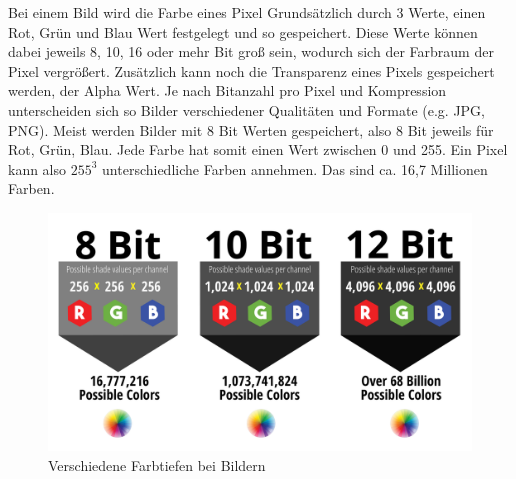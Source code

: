 Bei einem Bild wird die Farbe eines Pixel Grundsätzlich durch 3 Werte, einen Rot,
Grün und Blau Wert festgelegt und so gespeichert. Diese Werte können dabei jeweils
8, 10, 16 oder mehr Bit groß sein, wodurch sich der Farbraum der Pixel vergrößert.
Zusätzlich kann noch die Transparenz eines Pixels gespeichert werden, der Alpha Wert.
Je nach Bitanzahl pro Pixel und Kompression unterscheiden sich so Bilder verschiedener
Qualitäten und Formate (e.g. JPG, PNG). Meist werden Bilder mit 8 Bit Werten gespeichert,
also 8 Bit jeweils für Rot, Grün, Blau. Jede Farbe hat somit einen Wert zwischen 0 und 255.
Ein Pixel kann also $255^3$ unterschiedliche Farben annehmen. Das sind ca. 16,7 Millionen
Farben.

\begin{figure}[H]
    \centering
    \includegraphics[width=1\textwidth]{images/rgbvalues.png}
    \caption{Verschiedene Farbtiefen bei Bildern}
\end{figure}
